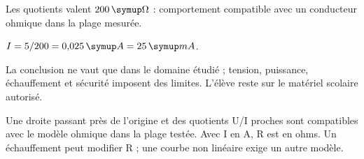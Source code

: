 \par\noindent\begin{minipage}{\linewidth}
\label{cor-defi-16}\begin{questions}
\item Les quotients valent $200\unite\Omega$ : comportement compatible avec un conducteur ohmique dans la plage mesurée.
\item $I=5/200=0{,}025\unite A=25\unite{mA}$.
\item La conclusion ne vaut que dans le domaine étudié ; tension, puissance, échauffement et sécurité imposent des limites. L’élève reste sur le matériel scolaire autorisé.
\end{questions}
\end{minipage}
\par\noindent\begin{minipage}{\linewidth}
\label{cor-activite-16}
Une droite passant près de l’origine et des quotients U/I proches sont compatibles avec le modèle ohmique dans la plage testée. Avec I en A, R est en ohms. Un échauffement peut modifier R ; une courbe non linéaire exige un autre modèle.\par\end{minipage}

